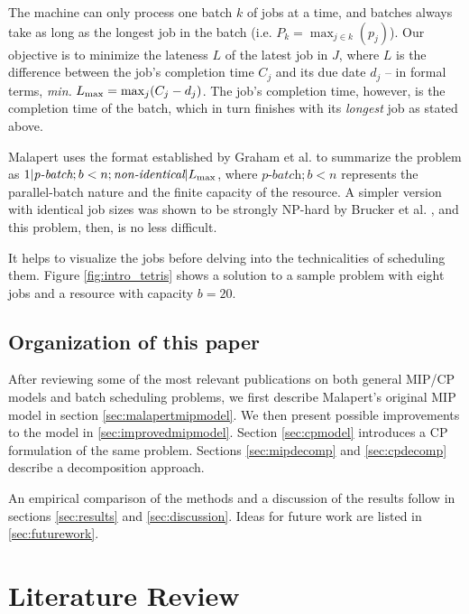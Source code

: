 \documentclass[13pt, letterpaper, oneside]{book}
\begin{document}
The machine can only process one batch $k$ of jobs at a time, and batches always
take as long as the longest job in the batch (i.e. $P_k = \max_{j \in k}(p_j)$).
Our objective is to minimize the lateness $L$ of the latest job in $J$, where
$L$ is the difference between the job's completion time $C_j$ and its due date
$d_j$ -- in formal terms, \textit{min.} $L_{\text{max}} = \max_j(C_j - d_j)$. The job's
completion time, however, is the completion time of the batch, which in turn
finishes with its \textit{longest} job as stated above.

Malapert uses the format established by Graham et al. \cite{graham_notation} to
summarize the problem as $1|\textit{p-batch}; b < n;
\textit{non-identical}|L_{\text{max}}$, where $\textit{p-batch};b<n$ represents the
parallel-batch nature and the finite capacity of the resource. A simpler version
with identical job sizes was shown to be strongly NP-hard by Brucker et al.
\cite{brucker}, and this problem, then, is no less difficult.

It helps to visualize the jobs before delving into the technicalities of
scheduling them. Figure \ref{fig:intro_tetris} shows a solution to a sample
problem with eight jobs and a resource with capacity $b = 20$.


\section{Organization of this paper}
After reviewing some of the most relevant publications on both general MIP/CP models and
batch scheduling problems, we first describe Malapert's original MIP model in
section \ref{sec:malapertmipmodel}. We then present possible improvements to the
model in \ref{sec:improvedmipmodel}. Section \ref{sec:cpmodel} introduces a CP formulation of the same
problem. Sections \ref{sec:mipdecomp} and \ref{sec:cpdecomp} describe a
decomposition approach.

An empirical comparison of the methods and a discussion of the results follow in
sections \ref{sec:results} and \ref{sec:discussion}. Ideas for future work are
listed in \ref{sec:futurework}.



\chapter{Literature Review}
\end{document}
